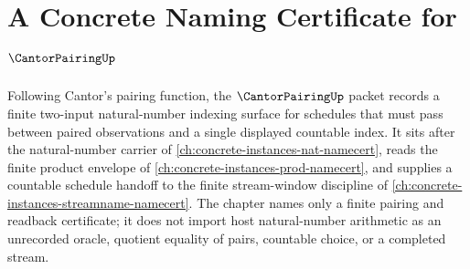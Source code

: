 \chapter{A Concrete Naming Certificate for $\CantorPairingUp$}
\label{ch:concrete-instances-cantor-pairing-namecert}

Following Cantor's pairing function, the $\CantorPairingUp$ packet records a finite two-input natural-number indexing surface for schedules that must pass between paired observations and a single displayed countable index. It sits after the natural-number carrier of \autoref{ch:concrete-instances-nat-namecert}, reads the finite product envelope of \autoref{ch:concrete-instances-prod-namecert}, and supplies a countable schedule handoff to the finite stream-window discipline of \autoref{ch:concrete-instances-streamname-namecert}. The chapter names only a finite pairing and readback certificate; it does not import host natural-number arithmetic as an unrecorded oracle, quotient equality of pairs, countable choice, or a completed stream.

